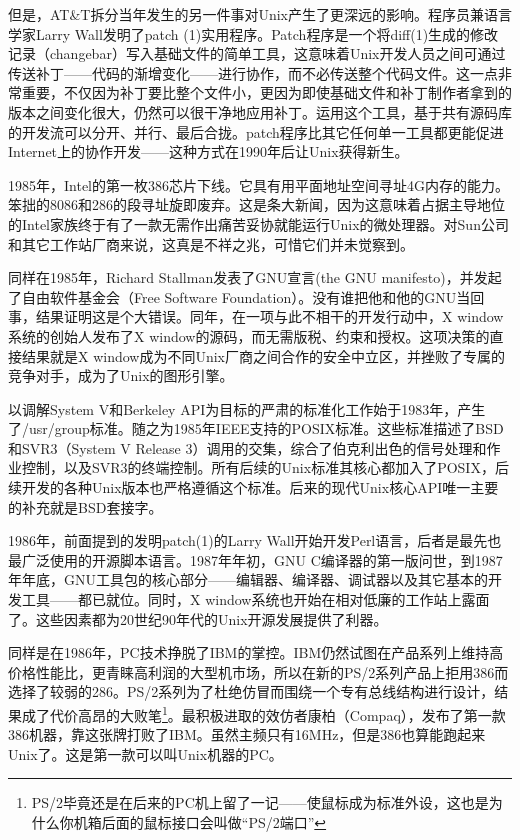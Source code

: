 \documentclass[12pt,oneside]{book}
\begin{document}
但是，AT\&{}T拆分当年发生的另一件事对Unix产生了更深远的影响。程序员兼语言学家Larry Wall发明了patch (1)实用程序。Patch程序是一个将diff(1)生成的修改记录（changebar）写入基础文件的简单工具，这意味着Unix开发人员之间可通过传送补丁——代码的渐增变化——进行协作，而不必传送整个代码文件。这一点非常重要，不仅因为补丁要比整个文件小，更因为即使基础文件和补丁制作者拿到的版本之间变化很大，仍然可以很干净地应用补丁。运用这个工具，基于共有源码库的开发流可以分开、并行、最后合拢。patch程序比其它任何单一工具都更能促进Internet上的协作开发——这种方式在1990年后让Unix获得新生。

1985年，Intel的第一枚386芯片下线。它具有用平面地址空间寻址4G内存的能力。笨拙的8086和286的段寻址旋即废弃。这是条大新闻，因为这意味着占据主导地位的Intel家族终于有了一款无需作出痛苦妥协就能运行Unix的微处理器。对Sun公司和其它工作站厂商来说，这真是不祥之兆，可惜它们并未觉察到。

同样在1985年，Richard Stallman发表了GNU宣言(the GNU manifesto)\cite{Stallman}，并发起了自由软件基金会（Free Software Foundation）。没有谁把他和他的GNU当回事，结果证明这是个大错误。同年，在一项与此不相干的开发行动中，X window系统的创始人发布了X window的源码，而无需版税、约束和授权。这项决策的直接结果就是X window成为不同Unix厂商之间合作的安全中立区，并挫败了专属的竞争对手，成为了Unix的图形引擎。

以调解System V和Berkeley API为目标的严肃的标准化工作始于1983年，产生了/usr/group标准。随之为1985年IEEE支持的POSIX标准。这些标准描述了BSD和SVR3（System V Release 3）调用的交集，综合了伯克利出色的信号处理和作业控制，以及SVR3的终端控制。所有后续的Unix标准其核心都加入了POSIX，后续开发的各种Unix版本也严格遵循这个标准。后来的现代Unix核心API唯一主要的补充就是BSD套接字。

1986年，前面提到的发明patch(1)的Larry Wall开始开发Perl语言，后者是最先也最广泛使用的开源脚本语言。1987年年初，GNU C编译器的第一版问世，到1987年年底，GNU工具包的核心部分——编辑器、编译器、调试器以及其它基本的开发工具——都已就位。同时，X window系统也开始在相对低廉的工作站上露面了。这些因素都为20世纪90年代的Unix开源发展提供了利器。

同样是在1986年，PC技术挣脱了IBM的掌控。IBM仍然试图在产品系列上维持高价格性能比，更青睐高利润的大型机市场，所以在新的PS/2系列产品上拒用386而选择了较弱的286。PS/2系列为了杜绝仿冒而围绕一个专有总线结构进行设计，结果成了代价高昂的大败笔\footnote{PS/2毕竟还是在后来的PC机上留了一记——使鼠标成为标准外设，这也是为什么你机箱后面的鼠标接口会叫做“PS/2端口”}。最积极进取的效仿者康柏（Compaq），发布了第一款386机器，靠这张牌打败了IBM。虽然主频只有16MHz，但是386也算能跑起来Unix了。这是第一款可以叫Unix机器的PC。
\end{document}
